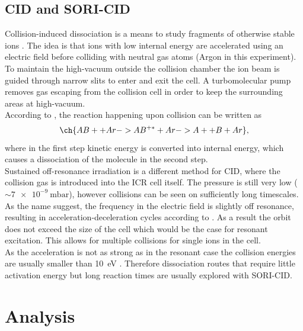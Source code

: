 \documentclass[a4paper,10pt]{article}
\begin{document}
\subsection{CID and SORI-CID}
Collision-induced dissociation is a means to study fragments of  otherwise stable ions \cite{ms_book}. The idea is that ions with low internal energy are accelerated using an electric field before colliding with neutral gas atoms (Argon in this experiment). To maintain the high-vacuum outside the collision chamber the ion beam is guided through narrow slits to enter and exit the cell. A turbomolecular pump removes gas escaping from the collision cell in order to keep the surrounding areas at high-vacuum. \\
According to \cite{ms_book}, the reaction happening upon collision can be written as
\begin{equation}
	\ch{AB+ + Ar -> AB^{+*} + Ar -> A+ + B + Ar}, 
\end{equation}
where in the first step kinetic energy is converted into internal energy, which causes a dissociation of the molecule in the second step. \\
Sustained off-resonance irradiation is a different method for CID, where the collision gas is introduced into the ICR cell itself. The pressure is still very low ($\sim \SI{7e-9}{\milli \bar}$), however collisions can be seen on sufficiently long timescales. As the name suggest, the frequency in the electric field is slightly off resonance, resulting in acceleration-deceleration cycles according to \cite{ms_book}. As a result the orbit does not exceed the size of the cell which would be the case for resonant excitation. This allows for multiple collisions for single ions in the cell. \\
As the acceleration is not as strong as in the resonant case the collision energies are usually smaller than \SI{10}{\electronvolt} \cite{ms_book}. Therefore dissociation routes that require little activation energy but long reaction times are usually explored with SORI-CID. 

\section{Analysis}
\end{document}

